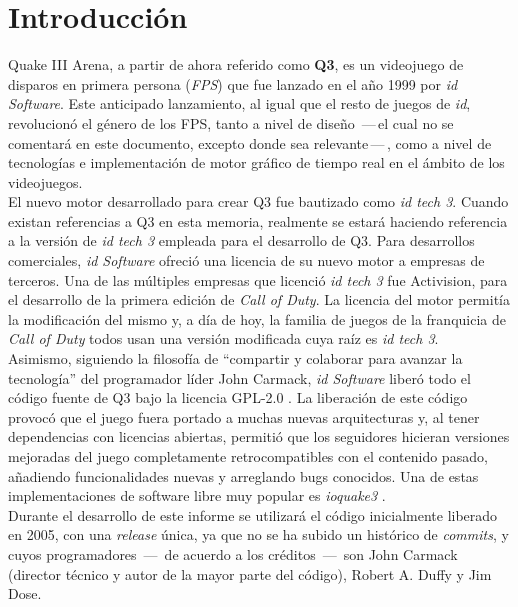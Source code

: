 \documentclass[a4paper,12pt]{report}
\begin{document}
	
	\tableofcontents
	\clearpage
	
	
	\section{Introducción}
	Quake III Arena, a partir de ahora referido como \textbf{Q3}, es un videojuego de disparos en primera persona (\textit{FPS}) que fue lanzado en el año 1999 por \textit{id Software}. Este anticipado lanzamiento, al igual que el resto de juegos de \textit{id}, revolucionó el género de los FPS, tanto a nivel de diseño \,---\,el cual no se comentará en este documento, excepto donde sea relevante\,---\,, como a nivel de tecnologías e implementación de motor gráfico de tiempo real en el ámbito de los videojuegos. \cite{quake3}\\
	
	El nuevo motor desarrollado para crear Q3 fue bautizado como \textit{id tech 3}. Cuando existan referencias a Q3 en esta memoria, realmente se estará haciendo referencia a la versión de \textit{id tech 3} empleada para el desarrollo de Q3. Para desarrollos comerciales, \textit{id Software} ofreció una licencia de su nuevo motor a empresas de terceros. Una de las múltiples empresas que licenció \textit{id tech 3} fue Activision, para el desarrollo de la primera edición de \textit{Call of Duty}. La licencia del motor permitía la modificación del mismo y, a día de hoy, la familia de juegos de la franquicia de \textit{Call of Duty} todos usan una versión modificada cuya raíz es \textit{id tech 3}. \cite{idtech3}\\
	
	Asimismo, siguiendo la filosofía de ``compartir y colaborar para avanzar la tecnología'' del programador líder John Carmack, \textit{id Software} liberó todo el código fuente de Q3 bajo la licencia GPL-2.0 \cite{sourcecode}. La liberación de este código provocó que el juego fuera portado a muchas nuevas arquitecturas y, al tener dependencias con licencias abiertas, permitió que los seguidores hicieran versiones mejoradas del juego completamente retrocompatibles con el contenido pasado, añadiendo funcionalidades nuevas y arreglando bugs conocidos. Una de estas implementaciones de software libre muy popular es \textit{ioquake3} \cite{ioquake3}. \\
	
	Durante el desarrollo de este informe se utilizará el código inicialmente liberado en 2005, con una \textit{release} única, ya que no se ha subido un histórico de \textit{commits}, y cuyos programadores  \,---\, de acuerdo a los créditos \,---\, son John Carmack (director técnico y autor de la mayor parte del código), Robert A. Duffy y Jim Dose.\\
	
\end{document}
